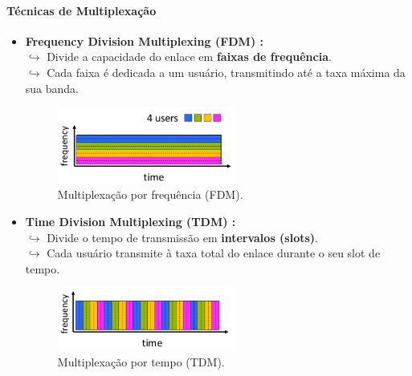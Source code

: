     \paragraph{Técnicas de Multiplexação}
    \begin{itemize}
        \item \textbf{Frequency Division Multiplexing (FDM) :} \\
            $\hookrightarrow$ Divide a capacidade do enlace em \textbf{faixas de frequência}. \\
            $\hookrightarrow$ Cada faixa é dedicada a um usuário, transmitindo até a taxa máxima da sua banda.
        
        \begin{figure}[H]
            \centering
            \includegraphics[width=0.55\textwidth]{img/cap-01/multiplexicacao-por-frequencia.png}
            \caption{Multiplexação por frequência (FDM).}
        \end{figure}

        \item \textbf{Time Division Multiplexing (TDM) :} \\
            $\hookrightarrow$ Divide o tempo de transmissão em \textbf{intervalos (slots)}. \\
            $\hookrightarrow$ Cada usuário transmite à taxa total do enlace durante o seu slot de tempo.
        
        \begin{figure}[H]
            \centering
            \includegraphics[width=0.55\textwidth]{img/cap-01/multiplexicacao-por-tempo.png}
            \caption{Multiplexação por tempo (TDM).}
        \end{figure}
    \end{itemize}

